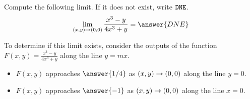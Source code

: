 \documentclass{ximera}
\author{Jim Talamo \and Bart Snapp}
\begin{document}
\begin{exercise}
  Compute the following limit. If it does not exist, write $\verb|DNE|$.
  \[
  \lim_{\point{x,y}\to \point{0,0}}\frac{x^3-y}{4x^3+y} = \answer{DNE}
  \]
 
 \begin{hint}
    To determine if this limit exists, consider the outputs of the function $F(x,y) =\frac{x^3-y}{4x^3+y}$ along the line $y = m x$.
    \begin{itemize}
    \item $F(x,y)$ approaches $\answer{1/4}$ as $\left(x,y\right) \to \left(0,0\right)$ along the line $y=0$.
    \item $F(x,y)$ approaches $\answer{-1}$ as $\left(x,y\right) \to \left(0,0\right)$ along the line $x=0$.
    \end{itemize}
\end{hint} 

\end{exercise}
\end{document}
